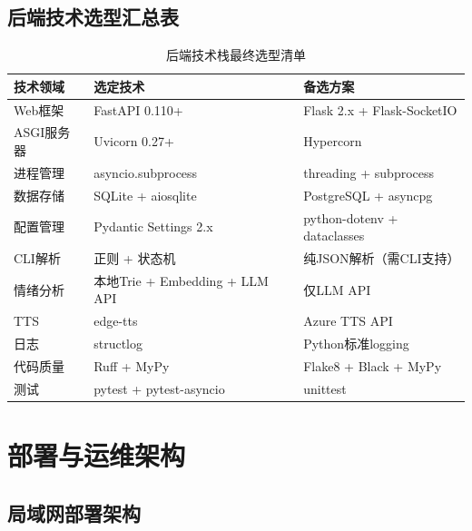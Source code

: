 \documentclass[fontset=mac,a4paper,11pt]{ctexart}
\begin{document}
\subsection{后端技术选型汇总表}

\begin{table}[H]
\centering
\caption{后端技术栈最终选型清单}
\label{tab:backend-summary}
\begin{tabular}{L{3.5cm}L{4cm}L{4.5cm}}
\toprule
\textbf{技术领域} & \textbf{选定技术} & \textbf{备选方案} \\
\midrule
{}
Web框架 & FastAPI 0.110+ & Flask 2.x + Flask-SocketIO \\
ASGI服务器 & Uvicorn 0.27+ & Hypercorn \\
进程管理 & asyncio.subprocess & threading + subprocess \\
数据存储 & SQLite + aiosqlite & PostgreSQL + asyncpg \\
配置管理 & Pydantic Settings 2.x & python-dotenv + dataclasses \\
CLI解析 & 正则 + 状态机 & 纯JSON解析（需CLI支持） \\
情绪分析 & 本地Trie + Embedding + LLM API & 仅LLM API \\
TTS & edge-tts & Azure TTS API \\
日志 & structlog & Python标准logging \\
代码质量 & Ruff + MyPy & Flake8 + Black + MyPy \\
测试 & pytest + pytest-asyncio & unittest \\
\bottomrule
\end{tabular}
\end{table}

\section{部署与运维架构}

\subsection{局域网部署架构}
\end{document}
